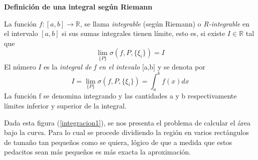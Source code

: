 \documentclass[10pt,twoside]{SelfArx} %
\begin{document}
\textbf{Definición de una integral según Riemann}\\
\begin{thm}
	La función $ f:[a,b]\rightarrow\mathbb{R} $, se llama \textsl{integrable} (seg\'un Riemann) o \textsl{R-integrable} en el intervalo $ [a,b] $ si sus sumas integrales tienen límite, esto es, si existe $ I\in\mathbb{R} $ tal que 
		\[ \lim\limits_{\{P\}}\sigma(f,P,\{\xi_{i}\})=I \]
		El número $ I $ es la \textsl{integral de f en el intevalo }[a,b] y se denota por
			\[ I=\lim\limits_{\{P\}}\sigma(f,P,\{\xi_{i}\})=\int_{a}^{b}f(x)dx \]
			La función f se denomina integrando y las cantidades a y b respectivamente límites
			inferior y superior de la integral.
\end{thm}
 Dada esta figura (\ref{integracion1}), se nos presenta el problema de calcular el área bajo la curva. Para lo cual se procede dividiendo la región en varios rectángulos de tamaño tan pequeños como se quiera, lógico de que a medida que estos pedacitos sean más pequeños es más exacta la aproximación.
 
 
 
\end{document}
